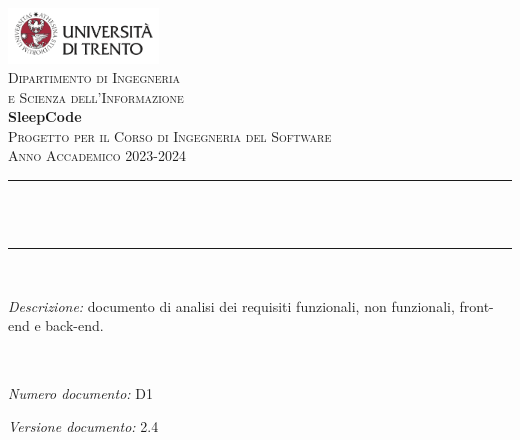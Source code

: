 \begin{titlepage}
\newcommand{\HRule}{\rule{\linewidth}{0.3mm}} %
\center %

\includegraphics[width=0.3\textwidth]{materiale/UniTrento_logo_ITA_colore.png}\\[0.5cm]
\textsc{\Large Dipartimento di Ingegneria\\e Scienza dell'Informazione}\\[1.5cm]

{\Huge\textbf{SleepCode}}\\[0.5cm]
\textsc{\large Progetto per il Corso di Ingegneria del Software}\\
\textsc{\large Anno Accademico 2023-2024}\\[0.5cm]


\HRule\\[0.4cm]
{\huge\bfseries \@title}\\[0.1cm]
\HRule\\[1cm]

\begin{minipage}{\textwidth}
\begin{flushleft}
\textit{Descrizione:} documento di analisi dei requisiti funzionali, non funzionali, front-end e back-end.
\end{flushleft}
\end{minipage}\\[1.5cm]


\begin{minipage}{0.4\textwidth}
\begin{flushleft}
\large
\textit{Numero documento:} D1
\end{flushleft}
\end{minipage}
\begin{minipage}{0.4\textwidth}
\begin{flushright}
\large
\textit{Versione documento:} 2.4
\end{flushright}
\end{minipage}\\[1.5cm]


\end{titlepage}
